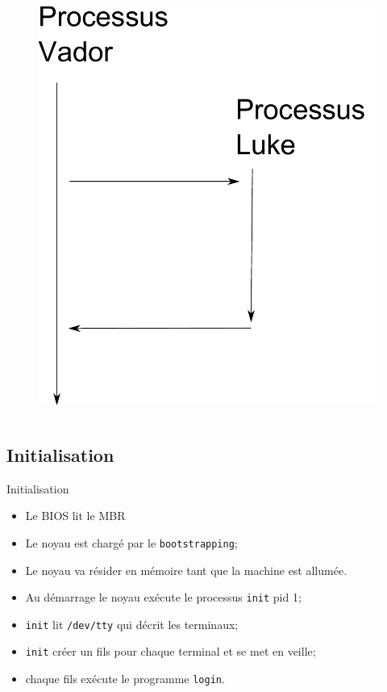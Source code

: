 \begin{frame}{\sectitle}
\begin{columns}[b]
        \begin{figure}
            \includegraphics[width=\textwidth]{images/PereFils.pdf}
        \end{figure}
    \end{columns}
\end{frame}


\begin{frame}{\sectitle}
\def\subsectitle{Initialisation}
\subsection{\subsectitle}

\begin{block}{\subsectitle}
\begin{itemize}
    \item Le BIOS lit le MBR
    \item Le noyau est chargé par le \texttt{bootstrapping};
    \item Le noyau va résider en mémoire tant que la machine est allumée.
    \item Au démarrage le noyau exécute le processus \texttt{init} pid 1;
    \item \texttt{init} lit \texttt{/dev/tty} qui décrit les terminaux;
    \item \texttt{init} créer un fils pour chaque terminal et se met en veille;
    \item chaque fils exécute le programme \texttt{login}.
\end{itemize}
\end{block}
\end{frame}

